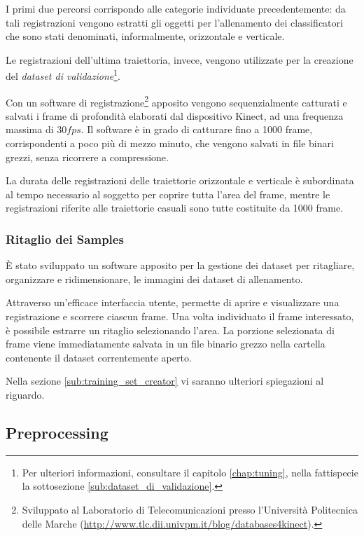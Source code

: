                I primi due percorsi corrispondo alle categorie individuate precedentemente: da tali registrazioni vengono estratti gli oggetti per l'allenamento dei classificatori che sono stati denominati, informalmente, orizzontale e verticale.

                Le registrazioni dell'ultima traiettoria, invece, vengono utilizzate per la creazione del \emph{dataset di validazione}\footnote{Per ulteriori informazioni, consultare il capitolo \ref{chap:tuning}, nella fattispecie la sottosezione \ref{sub:dataset_di_validazione}.}.

                Con un software di registrazione\footnote{Sviluppato al Laboratorio di Telecomunicazioni presso l'Università Politecnica delle Marche (\url{http://www.tlc.dii.univpm.it/blog/databases4kinect}).} apposito vengono sequenzialmente catturati e salvati i frame di profondità elaborati dal dispositivo Kinect, ad una frequenza massima di $30 fps$.
                Il software è in grado di catturare fino a 1000 frame, corrispondenti a poco più di mezzo minuto, che vengono salvati in file binari grezzi, senza ricorrere a compressione.

                La durata delle registrazioni delle traiettorie orizzontale e verticale è subordinata al tempo necessario al soggetto per coprire tutta l'area del frame, mentre le registrazioni riferite alle traiettorie casuali sono tutte costituite da 1000 frame.

            \subsubsection{Ritaglio dei Samples}
                È stato sviluppato un software apposito per la gestione dei dataset per ritagliare, organizzare e ridimensionare, le immagini dei dataset di allenamento.

                Attraverso un'efficace interfaccia utente, permette di aprire e visualizzare una registrazione e scorrere ciascun frame. 
                Una volta individuato il frame interessato, è possibile estrarre un ritaglio selezionando l'area. 
                La porzione selezionata di frame viene immediatamente salvata in un file binario grezzo nella cartella contenente il dataset correntemente aperto.

                Nella sezione \ref{sub:training_set_creator} vi saranno ulteriori spiegazioni al riguardo.

        \subsection{Preprocessing}
        \label{sub:preprocessing}
